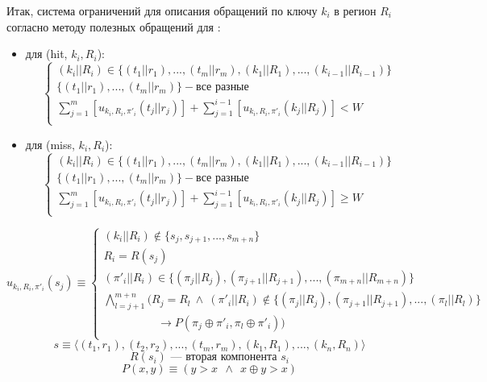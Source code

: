 Итак, система ограничений для описания обращений по ключу $k_i$ в регион $R_i$ согласно методу полезных обращений для \PseudoLRU:
\begin{itemize}
\item для (hit, $k_i, R_i$):
$$
\left\{\begin{array}{l}
(k_i||R_i) \in \{(t_1||r_1), ..., (t_m||r_m), (k_1||R_1), ..., (k_{i-1}||R_{i-1})\}\\
\{(t_1||r_1), ..., (t_m||r_m)\} - \mbox{все разные}\\
\sum\limits_{j=1}^m [u_{k_i,R_i,\pi'_i}(t_j||r_j)] + \sum\limits_{j=1}^{i-1} [u_{k_i,R_i,\pi'_i}(k_j||R_j)] < W\\
\end{array} \right.
$$
\item для (miss, $k_i, R_i$):
$$
\left\{\begin{array}{l}
(k_i||R_i) \in \{(t_1||r_1), ..., (t_m||r_m), (k_1||R_1), ..., (k_{i-1}||R_{i-1})\}\\
\{(t_1||r_1), ..., (t_m||r_m)\} - \mbox{все разные}\\
\sum\limits_{j=1}^m [u_{k_i,R_i,\pi'_i}(t_j||r_j)] + \sum\limits_{j=1}^{i-1} [u_{k_i,R_i,\pi'_i}(k_j||R_j)] \geqslant W\\
\end{array} \right.
$$
\end{itemize}

$$u_{k_i,R_i,\pi'_i} (s_j)  \equiv \left\{\begin{array}{l}
(k_i||R_i) \notin \{s_j, s_{j+1}, ..., s_{m+n}\}\\
R_i = R(s_j)\\
(\pi'_i||R_i) \in \{(\pi_j||R_j), (\pi_{j+1} || R_{j+1}), ..., (\pi_{m+n}||R_{m+n})\}\\
\bigwedge\limits_{l = j+1}^{m+n} (R_j = R_l ~\wedge~(\pi'_i||R_i) \notin \{(\pi_j||R_j), (\pi_{j+1}||R_{j+1}), ..., (\pi_l||R_l)\}\\
 \hspace{2cm} \rightarrow P(\pi_j \oplus \pi'_i, \pi_l \oplus \pi'_i))\\
\end{array}\right.
$$
$$s \equiv \langle (t_1,r_1), (t_2,r_2), ..., (t_m,r_m), (k_1, R_1), ..., (k_n,R_n) \rangle$$
$$R(s_i) \mbox{~--- вторая компонента~} s_i$$
$$P(x, y) \equiv (y > x~~\wedge~~x \oplus y > x)$$



